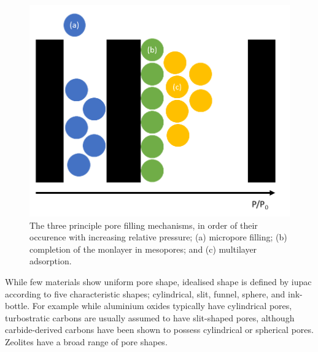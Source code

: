 \begin{figure}[ht!]
    \centering
    \includegraphics[width=\columnwidth, keepaspectratio]{1-introduction/figs/pore_filling.png}
    \caption{The three principle pore filling mechanisms, in order of their occurence with increasing relative pressure; (a) micropore filling; (b) completion of the monlayer in mesopores; and (c) multilayer adsorption.}
    \label{fig:filling}
\end{figure}

While few materials show uniform pore shape, idealised shape is defined by \acrshort{iupac} according to five characteristic shapes; cylindrical, slit, funnel, sphere, and ink-bottle.\citep{rouquerol1994recommendations, kaneko1994determination, zdravkov2007pore} For example while aluminium oxides typically have cylindrical pores,\citep{zdravkov2007pore} \glspl{turbostratic carbon} are usually assumed to have slit-shaped pores,\citep{Everett1976Adsorption, Jagiello20132D, Lastoskie1993} although carbide-derived carbons have been shown to possess cylindrical or spherical pores.\citep{kurig2016suitability} Zeolites have a broad range of pore shapes.\citep{park2002effect} 

